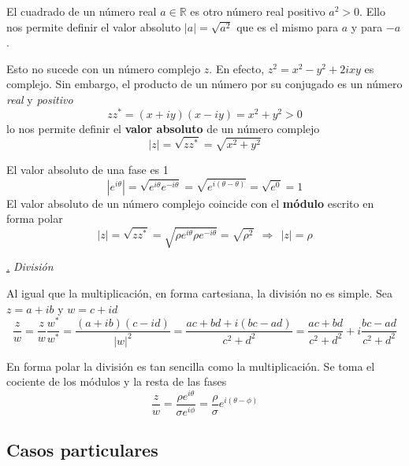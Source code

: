 \documentclass[a4paper,11pt]{book} %
\numberwithin{equation}{chapter}
\def\subsubiContadorIt{\par\addtocounter{subsubsection}{1}\underline{\it\thesubsubsection.}\hskip0.5cm \setcounter{subsubsubsectionIt}{0}}
\newcommand{\SubsubiIt}[1]{
		\subsubiContadorIt \textit{#1}
	}
\newcounter{subsubsubsectionIt}[subsubsection]
\begin{document}
El cuadrado de un número real $a\in {\mathbb R}$ es otro número real positivo $a^2 >0$. Ello nos permite definir
el valor absoluto $|a| = \sqrt{a^2}$ que es el mismo para $a$ y para $-a$.

Esto no sucede con un número complejo $z$. En efecto,  $z^2 = x^2 - y^2 +2i xy$ es complejo. Sin embargo, el producto de un número por su conjugado es un número \textit{real} y \textit{positivo}
\begin{equation}
z z^*  = (x + i y) (x-i y) = x^2 + y^2 >0
\end{equation}
lo nos permite definir el \textbf{valor absoluto} de un número complejo
	\begin{equation}
	\boxed{|z| = \sqrt{z z^*} = \sqrt{x^2 + y^2}}
	\end{equation}

El valor absoluto de una fase es 1
	\begin{equation}
	|e^{i\theta}| = \sqrt{ e^{i\theta}   e^{-i\theta}}=\sqrt{ e^{i(\theta-\theta)}}=\sqrt{e^0} = 1
	\end{equation}
El valor absoluto de un número complejo coincide con el \textbf{módulo} escrito en forma polar
	\begin{equation}
	|z| = \sqrt{zz^*} = \sqrt{\rho e^{i\theta} \rho e^{-i\theta}}=\sqrt{\rho^2} ~~ \Rightarrow ~~ \boxed{|z| = \rho}
	\end{equation}

			
			\SubsubiIt{División}
			
Al igual que la multiplicación, en forma cartesiana, la división no es simple. Sea $z = a+ i b$ y $w=c+i d$ 
	\begin{equation}
	\frac{z}{w} = \frac{z}{w}\frac{w^*}{w^*} = \frac{( a+ i b)(c-i d)}{|w|^2} = \frac{ac+bd + i(bc-ad)}{c^2+d^2}  = \frac{ac+bd}{c^2+d^2} +i\frac{bc-ad}{c^2+d^2}
	\end{equation}

En forma polar la división es tan sencilla como la multiplicación. Se toma el  cociente de los módulos y la resta de las fases
	\begin{equation}
	\frac{z}{w} = \frac{\rho e^{i\theta}}{\sigma e^{i\phi}} = \frac{\rho}{\sigma} e^{i(\theta-\phi)}
	\end{equation}


			
		\subsection{Casos particulares}
		
\end{document}
